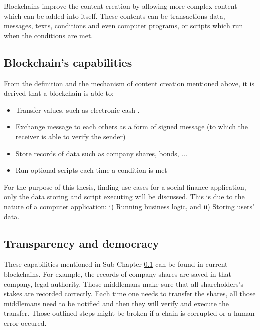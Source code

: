 Blockchains improve the content creation by allowing more complex content which can be added into itself. These contents can be transactions data, messages, texts, conditions and even computer programs, or scripts which run when the conditions are met.

\subsection{Blockchain's capabilities}
\label{blockchainCapabilities}

From the definition and the mechanism of content creation mentioned above, it is derived that a blockchain is able to:

\begin{itemize}
    \item Transfer values, such as electronic cash \citep{RefWorks:doc:BitcoinWhitepaper}.
    \item Exchange message to each others as a form of signed message (to which the receiver is able to verify the sender) \citep{RefWorks:doc:EthereumWhitepaper}
    \item Store records of data such as company shares, bonds, ... \citep{RefWorks:doc:SecuritiesOnBlockchain}
    \item Run optional scripts each time a condition is met \citep[s.~20]{RefWorks:doc:MasteringBlockchain}
\end{itemize}

For the purpose of this thesis, finding use cases for a social finance application, only the data storing and script executing will be discussed. This is due to the nature of a computer application: i) Running business logic, and ii) Storing users' data.

\subsection{Transparency and democracy}

These capabilities mentioned in Sub-Chapter \ref{blockchainCapabilities} can be found in current blockchains. For example, the records of company shares are saved in that company, legal authority. Those middlemans make sure that all shareholders's stakes are recorded correctly. Each time one needs to transfer the shares, all those middlemans need to be notified and then they will verify and execute the transfer. Those outlined steps might be broken if a chain is corrupted or a human error occured.

